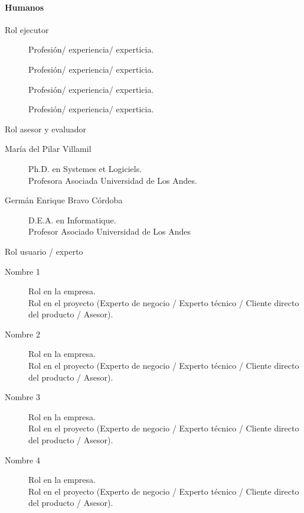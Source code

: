 \paragraph{Humanos}
\begin{description}[leftmargin=2cm,labelindent=1cm]
\item[Estudiantes] Rol ejecutor
  \begin{description}
    \item[\firstauthor] Profesión/ experiencia/ experticia.
    \item[\secondauthor] Profesión/ experiencia/ experticia.
    \item[\thirthauthor] Profesión/ experiencia/ experticia.
    \item[\fourthauthor] Profesión/ experiencia/ experticia.
  \end{description}
\item[Profesores] Rol asesor y evaluador
  \begin{description}
    \item[María del Pilar Villamil] Ph.D. en Systemes et Logiciels.\\
      Profesora Asociada Universidad de Los Andes.
    \item[Germán Enrique Bravo Córdoba] D.E.A. en Informatique.\\
      Profesor Asociado Universidad de Los Andes
  \end{description}
\item[Recursos de la Organización] Rol usuario / experto
  \begin{description}
    \item[Nombre 1] Rol en la empresa.\\Rol en el proyecto (Experto de negocio / Experto técnico / Cliente directo del producto / Asesor).
    \item[Nombre 2] Rol en la empresa.\\Rol en el proyecto (Experto de negocio / Experto técnico / Cliente directo del producto / Asesor).
    \item[Nombre 3] Rol en la empresa.\\Rol en el proyecto (Experto de negocio / Experto técnico / Cliente directo del producto / Asesor).
    \item[Nombre 4] Rol en la empresa.\\Rol en el proyecto (Experto de negocio / Experto técnico / Cliente directo del producto / Asesor).
  \end{description}
\end{description}

